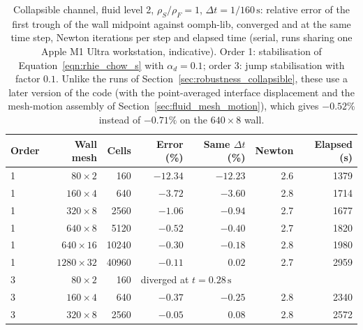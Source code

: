 \begin{table}[htbp]
	\centering
	\footnotesize
	\setlength{\tabcolsep}{3pt}
	\caption{Collapsible channel, fluid level 2, $\rho_S/\rho_F = 1$, $\Delta t = 1/160\,\mathrm{s}$: relative error of the first trough of the wall midpoint against oomph-lib, converged and at the same time step, Newton iterations per step and elapsed time (serial, runs sharing one Apple M1 Ultra workstation, indicative). Order 1: stabilisation of Equation~\eqref{eqn:rhie_chow_s} with $\alpha_d = 0.1$; order 3: jump stabilisation with factor $0.1$. Unlike the runs of Section~\ref{sec:robustness_collapsible}, these use a later version of the code (with the point-averaged interface displacement and the mesh-motion assembly of Section~\ref{sec:fluid_mesh_motion}), which gives $-0.52\%$ instead of $-0.71\%$ on the $640\times8$ wall.}
	\label{tab:ho_collapsible}
	\begin{tabular}{lrrrrrr}
		\toprule
		Order & Wall mesh & Cells & Error (\%) & Same $\Delta t$ (\%) & Newton & Elapsed (s) \\
		\midrule
		1 & $80\times2$    & 160    & $-12.34$ & $-12.23$ & 2.6 & 1379 \\
		1 & $160\times4$   & 640    & $-3.72$  & $-3.60$  & 2.8 & 1714 \\
		1 & $320\times8$   & 2560   & $-1.06$  & $-0.94$  & 2.7 & 1677 \\
		1 & $640\times8$   & 5120   & $-0.52$  & $-0.40$  & 2.7 & 1820 \\
		1 & $640\times16$  & 10240  & $-0.30$  & $-0.18$  & 2.8 & 1980 \\
		1 & $1280\times32$ & 40960  & $-0.11$  & $0.02$   & 2.7 & 2959 \\
		3 & $80\times2$    & 160    & \multicolumn{4}{l}{diverged at $t = 0.28\,\mathrm{s}$} \\
		3 & $160\times4$   & 640    & $-0.37$  & $-0.25$  & 2.8 & 2340 \\
		3 & $320\times8$   & 2560   & $-0.05$  & $0.08$   & 2.8 & 2572 \\
		\bottomrule
	\end{tabular}
\end{table}

